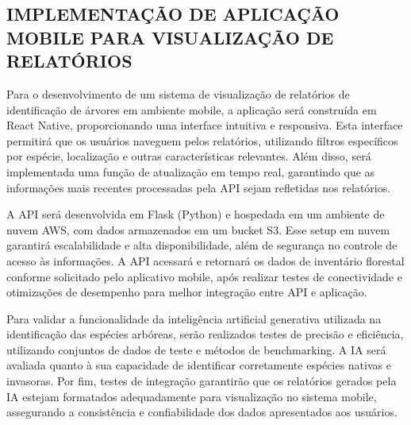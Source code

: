 \subsection*{IMPLEMENTAÇÃO DE APLICAÇÃO MOBILE PARA VISUALIZAÇÃO DE RELATÓRIOS}
Para o desenvolvimento de um sistema de visualização de relatórios de identificação de árvores em ambiente mobile, a aplicação será construída em React Native, proporcionando uma interface intuitiva e responsiva. Esta interface permitirá que os usuários naveguem pelos relatórios, utilizando filtros específicos por espécie, localização e outras características relevantes. Além disso, será implementada uma função de atualização em tempo real, garantindo que as informações mais recentes processadas pela API sejam refletidas nos relatórios.

A API será desenvolvida em Flask (Python) e hospedada em um ambiente de nuvem AWS, com dados armazenados em um bucket S3. Esse setup em nuvem garantirá escalabilidade e alta disponibilidade, além de segurança no controle de acesso às informações. A API acessará e retornará os dados de inventário florestal conforme solicitado pelo aplicativo mobile, após realizar testes de conectividade e otimizações de desempenho para melhor integração entre API e aplicação.

Para validar a funcionalidade da inteligência artificial generativa utilizada na identificação das espécies arbóreas, serão realizados testes de precisão e eficiência, utilizando conjuntos de dados de teste e métodos de benchmarking. A IA será avaliada quanto à sua capacidade de identificar corretamente espécies nativas e invasoras. Por fim, testes de integração garantirão que os relatórios gerados pela IA estejam formatados adequadamente para visualização no sistema mobile, assegurando a consistência e confiabilidade dos dados apresentados aos usuários.